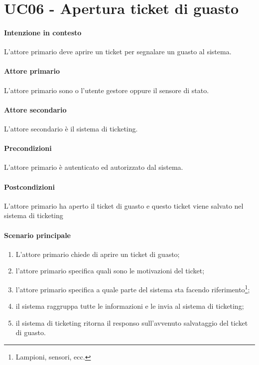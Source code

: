 \section{UC06 - Apertura ticket di guasto}\label{uc:06}

\paragraph{Intenzione in contesto} L'attore primario deve aprire un ticket per segnalare un guasto al sistema.

\paragraph{Attore primario} L'attore primario sono o l'utente gestore oppure il sensore di stato.

\paragraph{Attore secondario} L'attore secondario è il sistema di ticketing.


\paragraph{Precondizioni} L'attore primario è autenticato ed autorizzato dal sistema.

\paragraph{Postcondizioni} L'attore primario ha aperto il ticket di guasto e questo ticket viene salvato nel sistema di ticketing

\paragraph{Scenario principale}

\begin{enumerate}
    \item L'attore primario chiede di aprire un ticket di guasto;
    \item l'attore primario specifica quali sono le motivazioni del ticket;
    \item l'attore primario specifica a quale parte del sistema sta facendo riferimento\footnote{Lampioni, sensori, ecc.};
    \item il sistema raggruppa tutte le informazioni e le invia al sistema di ticketing;
    \item il sistema di ticketing ritorna il responso sull'avvenuto salvataggio del ticket di guasto.
\end{enumerate}
